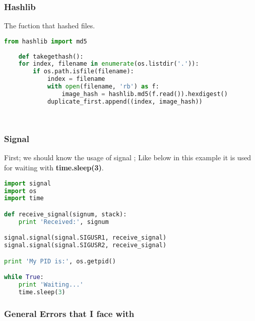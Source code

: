 \documentclass[onecolumn]{article}
\begin{document}
\subsubsection{Hashlib}

The fuction that hashed files.

\begin{lstlisting}[language=Python, caption=Hash Generator Function]
    from hashlib import md5 
    
    def takegethash():  
    for index, filename in enumerate(os.listdir('.')):
        if os.path.isfile(filename):
            index = filename
            with open(filename, 'rb') as f:
                image_hash = hashlib.md5(f.read()).hexdigest()
            duplicate_first.append((index, image_hash))

   
\end{lstlisting}

\subsubsection{Signal}

 First; we should know the usage of signal ; Like below in this example it is used for waiting with  \textbf{time.sleep(3)}. 
 
 \begin{lstlisting}[language=Python, caption=Signal]
 import signal
import os
import time

def receive_signal(signum, stack):
    print 'Received:', signum

signal.signal(signal.SIGUSR1, receive_signal)
signal.signal(signal.SIGUSR2, receive_signal)

print 'My PID is:', os.getpid()

while True:
    print 'Waiting...'
    time.sleep(3)
\end{lstlisting}

\subsubsection{General Errors that I face with}
\end{document}
